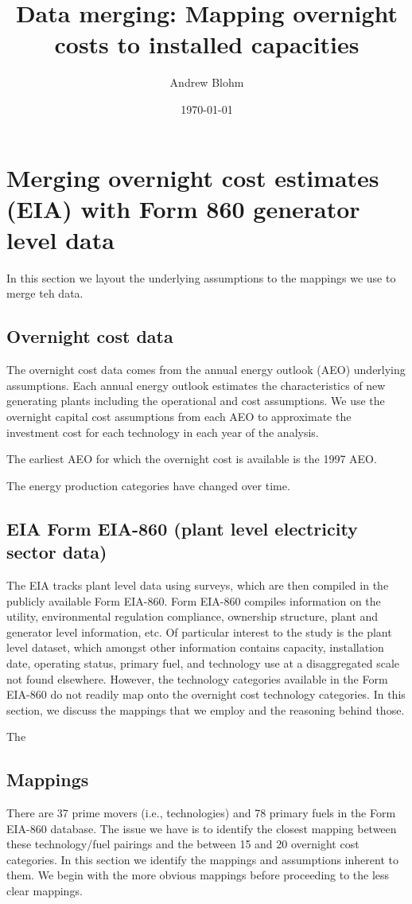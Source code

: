 \documentclass[10pt]{amsart}
\title{Data merging: Mapping overnight costs to installed capacities}
\author{Andrew Blohm}
\date{\today}
\begin{document}
\maketitle

\section{Merging overnight cost estimates (EIA) with Form 860 generator level data}
In this section we layout the underlying assumptions to the mappings we use to merge teh data.

\subsection{Overnight cost data}
The overnight cost data comes from the annual energy outlook (AEO) underlying assumptions. 
Each annual energy outlook estimates the characteristics of new generating plants including the operational and cost assumptions.
We use the overnight capital cost assumptions from each AEO to approximate the investment cost for each technology in each year of the analysis.

The earliest AEO for which the overnight cost is available is the 1997 AEO.

The energy production categories have changed over time. 

\subsection{EIA Form EIA-860 (plant level electricity sector data)}
The EIA tracks plant level data using surveys, which are then compiled in the publicly available Form EIA-860.
Form EIA-860 compiles information on the utility, environmental regulation compliance, ownership structure, plant and generator level information, etc.  
Of particular interest to the study is the plant level dataset, which amongst other information contains capacity, installation date, operating status, primary fuel, and technology use at a disaggregated scale not found elsewhere.
However, the technology categories available in the Form EIA-860 do not readily map onto the overnight cost technology categories. 
In this section, we discuss the mappings that we employ and the reasoning behind those. 

The 

\subsection{Mappings}
There are 37 prime movers (i.e., technologies) and 78 primary fuels in the Form EIA-860 database. 
The issue we have is to identify the closest mapping between these technology/fuel pairings and the between 15 and 20 overnight cost categories.
In this section we identify the mappings and assumptions inherent to them.
We begin with the more obvious mappings before proceeding to the less clear mappings.
\end{document}
